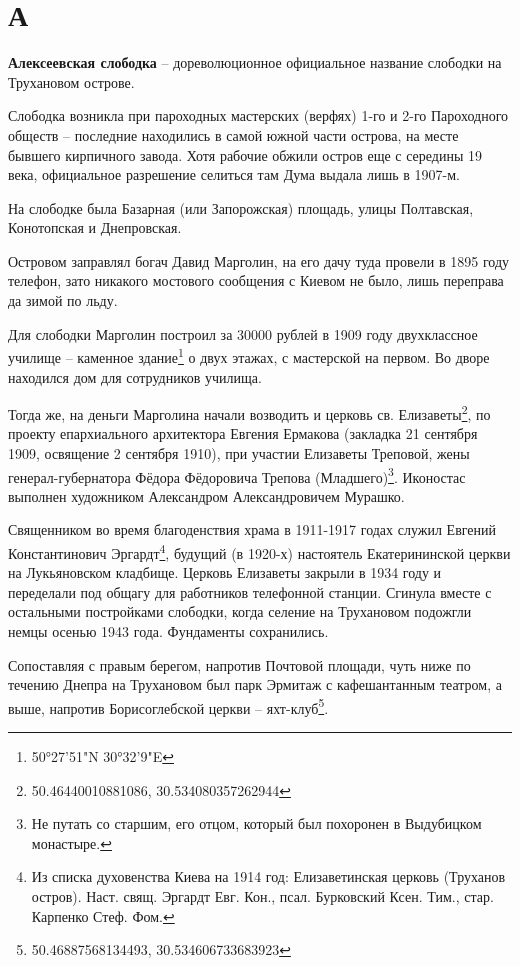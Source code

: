 \chapter*{А}

\textbf{Алексеевская слободка} –  дореволюционное официальное название слободки на Трухановом острове.

Слободка возникла при пароходных мастерских (верфях) 1-го и 2-го Пароходного обществ – последние находились в самой южной части острова, на месте бывшего кирпичного завода. Хотя рабочие обжили остров еще с середины 19 века, официальное разрешение селиться там Дума выдала лишь в 1907-м. 

На слободке была Базарная (или Запорожская) площадь, улицы Полтавская, Конотопская и Днепровская.

Островом заправлял богач Давид Марголин, на его дачу туда провели в 1895 году телефон, зато никакого мостового сообщения с Киевом не было, лишь переправа да зимой по льду.

Для слободки Марголин построил за 30000 рублей в 1909 году двухклассное училище – каменное здание\footnote{50°27'51"N 30°32'9"E} о двух этажах, с мастерской на первом. Во дворе находился дом для сотрудников училища.

Тогда же, на деньги Марголина начали возводить и церковь св. Елизаветы\footnote{50.46440010881086, 30.534080357262944}, по проекту епархиального архитектора Евгения Ермакова (закладка 21 сентября 1909, освящение 2 сентября 1910), при участии Елизаветы Треповой, жены генерал-губернатора Фёдора Фёдоровича Трепова (Младшего)\footnote{Не путать со старшим, его отцом, который был похоронен в Выдубицком монастыре.}. Иконостас выполнен художником Александром Александровичем Мурашко. 

Священником во время благоденствия храма в 1911-1917 годах служил Евгений Константинович Эргардт\footnote{Из списка духовенства Киева на 1914 год: Елизаветинская церковь (Труханов остров). Наст. свящ. Эргардт Евг. Кон., псал. Бурковский Ксен. Тим., стар. Карпенко Стеф. Фом.}, будущий (в 1920-х) настоятель Екатерининской церкви на Лукьяновском кладбище. Церковь Елизаветы закрыли в 1934 году и переделали под общагу для работников телефонной станции. Сгинула вместе с остальными постройками слободки, когда селение на Трухановом подожгли немцы осенью 1943 года. Фундаменты сохранились.

Сопоставляя с правым берегом, напротив Почтовой площади, чуть ниже по течению Днепра на Трухановом был парк Эрмитаж с кафешантанным театром, а выше, напротив Борисоглебской церкви – яхт-клуб\footnote{50.46887568134493, 30.534606733683923}.\\

